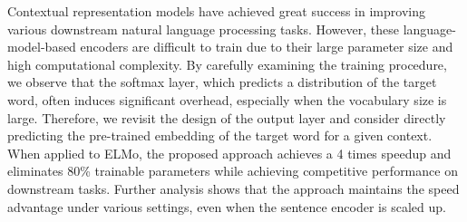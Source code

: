 Contextual representation models have achieved great success in improving various downstream natural language processing tasks. However, these language-model-based encoders are difficult to train due to their large parameter size and high computational complexity. By carefully examining the training procedure, we observe that the softmax layer, which predicts a distribution of the target word, often induces significant overhead, especially when the vocabulary size is large. Therefore, we revisit the design of the output layer and consider directly predicting the pre-trained embedding of the target word for a given context. When applied to ELMo, the proposed approach achieves a 4 times speedup and eliminates 80\% trainable parameters while achieving competitive performance on downstream tasks. Further analysis shows that the approach maintains the speed advantage under various settings, even when the sentence encoder is scaled up.
